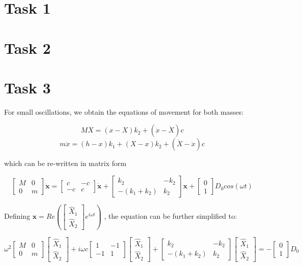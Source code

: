 \documentclass[a4paper]{article}
\begin{document}
\section{Task 1}

\section{Task 2}

\section{Task 3}

For small oscillations, we obtain the equations of movement for both masses:

$$ M\ddot{X} = ( x - X ) k_2 + ( \dot{x} - \dot{X} ) c $$
$$ m\ddot{x} = ( h - x ) k_1 + ( X - x ) k_2 + ( \dot{X} - \dot{x} ) c $$

which can be re-written in matrix form

$$
\begin{bmatrix} M & 0 \\ 0 & m \end{bmatrix} \ddot{\mathbf{x}}
= \begin{bmatrix} c & -c \\ -c & c \end{bmatrix} \dot{\mathbf{x}}
+ \begin{bmatrix} k_2 & -k_2 \\ -(k_1+k_2) & k_2 \end{bmatrix} \mathbf{x}
+ \begin{bmatrix} 0 \\ 1 \end{bmatrix} D_0 cos(\omega t)
$$

Defining 
$ \mathbf{x} = Re\left( \begin{bmatrix} \hat{X}_1 \\ \hat{X}_2 \end{bmatrix} e^{i\omega t} \right) $
, the equation can be further simplified to:

$$
\omega ^2 \begin{bmatrix} M & 0 \\ 0 & m \end{bmatrix} \begin{bmatrix} \hat{X}_1 \\ \hat{X}_2 \end{bmatrix}
+ i\omega c \begin{bmatrix} 1 & -1 \\ -1 & 1 \end{bmatrix} \begin{bmatrix} \hat{X}_1 \\ \hat{X}_2 \end{bmatrix}
+ \begin{bmatrix} k_2 & -k_2 \\ -(k_1+k_2) & k_2 \end{bmatrix} \begin{bmatrix} \hat{X}_1 \\ \hat{X}_2 \end{bmatrix}
= -\begin{bmatrix} 0 \\ 1 \end{bmatrix} D_0
$$
\end{document}
